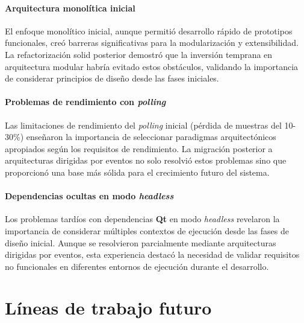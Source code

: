 \subsubsection{Arquitectura monolítica inicial}
\label{subsubsec:arquitectura_monolitica}

El enfoque monolítico inicial, aunque permitió desarrollo rápido de prototipos funcionales, creó barreras significativas para la modularización y extensibilidad. La refactorización \acrshort{solid} posterior demostró que la inversión temprana en arquitectura modular habría evitado estos obstáculos, validando la importancia de considerar principios de diseño desde las fases iniciales.

\subsubsection{Problemas de rendimiento con \textit{\gls{polling}}}
\label{subsubsec:problemas_polling}

Las limitaciones de rendimiento del \textit{\gls{polling}} inicial (pérdida de muestras del 10-30\%) enseñaron la importancia de seleccionar paradigmas arquitectónicos apropiados según los requisitos de rendimiento. La migración posterior a arquitecturas dirigidas por eventos no solo resolvió estos problemas sino que proporcionó una base más sólida para el crecimiento futuro del sistema.

\subsubsection{Dependencias ocultas en modo \textit{\gls{headless}}}
\label{subsubsec:dependencias_headless}

Los problemas tardíos con dependencias \textbf{Qt} en modo \textit{\gls{headless}} revelaron la importancia de considerar múltiples contextos de ejecución desde las fases de diseño inicial. Aunque se resolvieron parcialmente mediante arquitecturas dirigidas por eventos, esta experiencia destacó la necesidad de validar requisitos no funcionales en diferentes entornos de ejecución durante el desarrollo.

{
\titlespacing*{\chapter}{0pt}{-0.1\textheight}{20pt}
\chapter{Líneas de trabajo futuro}
\label{chap:lineas_futuro}
}

